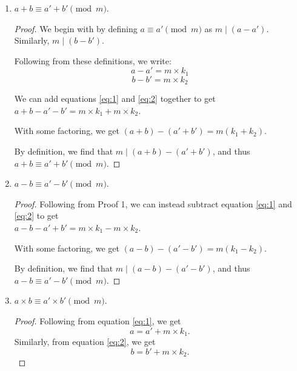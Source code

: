 \documentclass{article}
\begin{document}
\begin{enumerate}
    \item {
        \(a + b \equiv a' + b' \pmod{m}\).

        \begin{proof}
            We begin with by defining \(a \equiv a' \pmod{m}\) as \(m \mid (a - a')\).
            Similarly, \(m \mid (b - b')\).

            Following from these definitions, we write:
            \begin{equation} \label{eq:1}
                a - a' = m \times k_1
            \end{equation}
            \begin{equation} \label{eq:2}
                b - b' = m \times k_2
            \end{equation}

            We can add equations \ref{eq:1} and \ref{eq:2} together to get 
            \(a + b - a' - b' = m \times k_1 + m \times k_2\).

            With some factoring, we get \((a + b) - (a' + b') = m (k_1 + k_2)\).

            By definition, we find that \(m \mid (a + b) - (a' + b')\), and thus
            \(a + b \equiv a' + b' \pmod{m}\).
        \end{proof}
    }

    \item {
        \(a - b \equiv a' - b' \pmod{m}\).

        \begin{proof}
            Following from Proof 1, we can instead subtract equation \ref{eq:1}
            and \ref{eq:2} to get 
            \\ \(a - b - a' + b' = m \times k_1 - m \times k_2\).

            With some factoring, we get \((a-b) - (a'-b') = m(k_1 - k_2)\).

            By definition, we find that \(m \mid (a - b) - (a' - b')\), and thus
            \(a - b \equiv a' - b' \pmod{m}\).
        \end{proof}
    }

    \item {
        \(a \times b \equiv a' \times b' \pmod{m}\).

        \begin{proof}
            Following from equation \ref{eq:1}, we get 
            \begin{equation} \label{eq:3}
                a = a' + m \times k_1.
            \end{equation}
            Similarly, from equation \ref{eq:2}, we  get 
            \begin{equation} \label{eq:4}
                b = b' + m \times k_2.
            \end{equation}


\end{proof}}
\end{enumerate}
\end{document}
